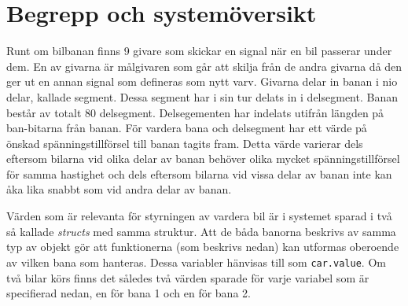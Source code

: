 \section{Begrepp och systemöversikt}
\label{sec:begrepp och systemöversikt}

Runt om bilbanan finns 9 givare som skickar en signal när
en bil passerar under dem. En av givarna är målgivaren som går att skilja från de andra givarna då den ger ut en annan signal som defineras som nytt varv. Givarna delar in banan i nio delar, kallade segment. Dessa segment har i sin tur delats in i delsegment. Banan består av totalt 80 delsegment. Delsegementen har indelats utifrån längden på ban-bitarna från banan.
För vardera bana och delsegment har ett värde på önskad spänningstillförsel till
banan tagits fram. Detta värde varierar dels eftersom bilarna vid olika delar av
banan behöver olika mycket spänningstillförsel för samma hastighet och dels
eftersom bilarna vid vissa delar av banan inte kan åka lika snabbt som vid andra
delar av banan.

Värden som är relevanta för styrningen av vardera bil är i systemet sparad i
två så kallade \emph{structs} med samma struktur. Att de båda banorna beskrivs
av samma typ av objekt gör att funktionerna (som beskrivs nedan) kan utformas
oberoende av vilken bana som hanteras. Dessa variabler hänvisas till som
\texttt{car.value}. Om två bilar körs finns det således två värden sparade för
varje variabel som är specifierad nedan, en för bana 1 och en för bana 2.

